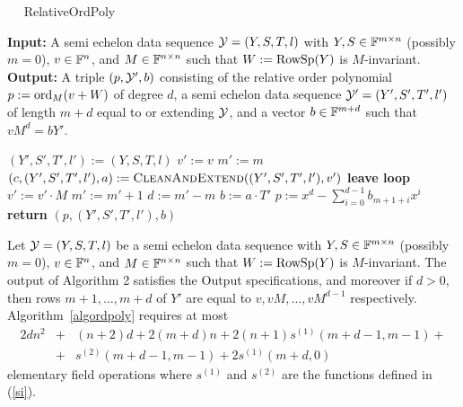 \begin{algorithm}[t]
\caption{$\quad$ \sc RelativeOrdPoly}
\label{algordpoly}
%
\begin{algorithmic}
\STATE \textbf{Input:} A semi echelon data sequence $\mathcal{Y}=(Y,S,T,l)$ with 
$Y,S \in \mathbb{F}^{m \times n}$ (possibly $m=0$),
$v \in \mathbb{F}^n$, 
and $M \in \mathbb{F}^{n \times n}$ such that $W:=\mathrm{RowSp}(Y)$ is $M$-invariant.
\STATE \textbf{Output:} A triple $(p,\mathcal{Y}',b)$ consisting of the
relative order polynomial $p := \mathrm{ord}_M(v+W)$ of degree $d$,
a semi echelon data sequence $\mathcal{Y}'=(Y',S',T',l')$ of length $m+d$ equal
to or extending $\mathcal{Y}$, and a vector $b \in \mathbb{F}^{m+d}$ such that $vM^d =
bY'$.

\vspace*{2mm}
\STATE $(Y',S',T',l') := (Y,S,T,l)$ \hspace*{2mm}
\STATE $v' := v$
\STATE $m' := m$ \hspace*{3.08cm}  
\LOOP
    \STATE $(c,(Y',S',T',l'),a) := \mbox{\sc CleanAndExtend}((Y',S',T',l'),v')$  
    \STATE \hspace*{5cm} 
        \STATE \textbf{leave loop}
    \ENDIF
    \STATE $v' := v' \cdot M$
     \STATE $m' := m' +1$	
\ENDLOOP \hspace*{1.5cm}  
\STATE $d := m'-m$
\STATE $b := a\cdot T'$
\STATE $p :=x^d-\sum_{i=0}^{d-1} b_{m+1+i} x^i$
\STATE \textbf{return} $(p, (Y',S',T',l'),b)$
\end{algorithmic}
\end{algorithm}

\begin{Prop}
\label{proprelorderpol}
%
Let $\mathcal{Y}=(Y,S,T,l)$ be a semi echelon data sequence with $Y,S \in \mathbb{F}^{m \times
n}$ (possibly $m=0$), $v \in \mathbb{F}^n$, and $M \in \mathbb{F}^{n \times n}$
such that $W:=\mathrm{RowSp}(Y)$ is $M$-invariant. 
The output of Algorithm 2 satisfies the Output specifications, and
moreover if $d>0$, then
rows $m+1, \ldots, m+d$ of $Y'$ are equal to $v,vM,\ldots,vM^{d-1}$
respectively.
Algorithm~\ref{algordpoly} requires at most
\begin{eqnarray*}
2dn^2 &+& (n+2)d +2(m+d)n 
+ 2(n+1)s^{(1)}(m+d-1,m-1) +  \\
 &+& s^{(2)}(m+d-1,m-1) 
+ 2s^{(1)}(m+d,0)
\end{eqnarray*}
elementary field operations where $s^{(1)}$ and $s^{(2)}$ are the
functions defined in (\ref{si}).
\end{Prop}

